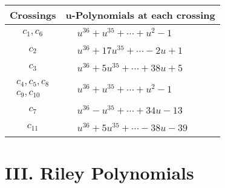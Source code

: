 \documentclass[1p]{elsarticle_modified}
\theoremstyle{definition}
\begin{document}
\begin{tabular}{m{50pt}|m{274pt}}
Crossings & \hspace{64pt}u-Polynomials at each crossing \\
\hline $$\begin{aligned}c_{1},c_{6}\end{aligned}$$&$\begin{aligned}
&u^{36}+u^{35}+\cdots+u^2-1
\end{aligned}$\\
\hline $$\begin{aligned}c_{2}\end{aligned}$$&$\begin{aligned}
&u^{36}+17 u^{35}+\cdots-2 u+1
\end{aligned}$\\
\hline $$\begin{aligned}c_{3}\end{aligned}$$&$\begin{aligned}
&u^{36}+5 u^{35}+\cdots+38 u+5
\end{aligned}$\\
\hline $$\begin{aligned}c_{4},c_{5},c_{8}\\c_{9},c_{10}\end{aligned}$$&$\begin{aligned}
&u^{36}+u^{35}+\cdots+u^2-1
\end{aligned}$\\
\hline $$\begin{aligned}c_{7}\end{aligned}$$&$\begin{aligned}
&u^{36}- u^{35}+\cdots+34 u-13
\end{aligned}$\\
\hline $$\begin{aligned}c_{11}\end{aligned}$$&$\begin{aligned}
&u^{36}+5 u^{35}+\cdots-38 u-39
\end{aligned}$\\
\hline
\end{tabular}\newpage\renewcommand{\arraystretch}{1}
\centering \section*{ III. Riley Polynomials}
\end{document}

